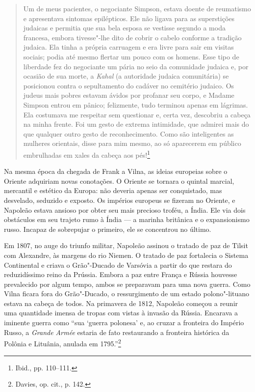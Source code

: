 \begin{quote}
Um de meus pacientes, o negociante Simpson, estava doente de reumatismo
e apresentava sintomas epilépticos. Ele não ligava para as superstições
judaicas e permitia que sua bela esposa se vestisse segundo a moda
francesa, embora tivesse"-lhe dito de cobrir o cabelo conforme a tradição
judaica. Ela tinha a própria carruagem e era livre para sair em visitas
sociais; podia até mesmo flertar um pouco com os homens. Esse tipo de
liberdade fez do negociante um pária no seio da comunidade judaica e,
por ocasião de sua morte, a \textit{Kahal} (a autoridade judaica comunitária) se
posicionou contra o sepultamento do cadáver no cemitério judaico. Os
judeus mais pobres estavam ávidos por profanar seu corpo, e Madame
Simpson entrou em pânico; felizmente, tudo terminou apenas em lágrimas.
Ela costumava me respeitar sem questionar e, certa vez, descobriu a
cabeça na minha frente. Foi um gesto de extrema intimidade, que admirei
mais do que qualquer outro gesto de reconhecimento. Como são
inteligentes as mulheres orientais, disse para mim mesmo, ao só
aparecerem em público embrulhadas em xales da cabeça aos pés!\footnote{Ibid., pp. 110--111.} \end{quote}

Na mesma época da chegada de Frank a Vilna, as ideias europeias sobre o
Oriente adquiriam novas conotações. O Oriente se tornara o quintal
marcial, mercantil e estético da Europa: não deveria apenas ser
conquistado, mas desvelado, seduzido e exposto. Os impérios europeus se
fizeram no Oriente, e Napoleão estava ansioso por obter seu mais
precioso troféu, a Índia. Ele via dois obstáculos em seu trajeto rumo à
Índia --- a marinha britânica e o expansionismo russo. Incapaz de
sobrepujar o primeiro, ele se concentrou no último.

Em 1807, no auge do triunfo militar, Napoleão assinou o tratado de paz
de Tilsit com Alexandre, às margens do rio Niemen. O tratado de paz
fortalecia o Sistema Continental e criava o Grão"-Ducado de Varsóvia a
partir do que restara do reduzidíssimo reino da Prússia. Embora a paz
entre França e Rússia houvesse prevalecido por algum tempo, ambos se
preparavam para uma nova guerra. Como Vilna ficara fora do Grão"-Ducado,
o ressurgimento de um estado polono"-lituano estava na cabeça de todos.
Na primavera de 1812, Napoleão começou a reunir uma quantidade imensa de
tropas com vistas à invasão da Rússia. Encarava a iminente guerra como
``sua `guerra polonesa' e, ao cruzar a fronteira do Império Russo, a
\textit{Grande Armée} estaria de fato restaurando a fronteira histórica da
Polônia e Lituânia, anulada em 1795.''\footnote{Davies, op. cit., p. 142.}

